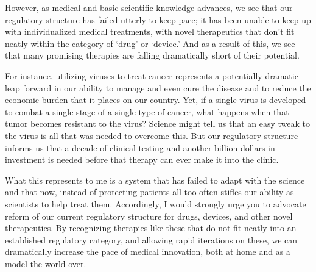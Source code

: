 \documentclass[11pt,letterpaper,final] {article}
\begin{document}
However, as medical and basic scientific knowledge advances, we see that our regulatory structure has failed utterly to keep pace; it has been unable to keep up with individualized medical treatments, with novel therapeutics that don't fit neatly within the category of `drug' or `device.' And as a result of this, we see that many promising therapies are falling dramatically short of their potential.

For instance, utilizing viruses to treat cancer represents a potentially dramatic leap forward in our ability to manage and even cure the disease and to reduce the economic burden that it places on our country. Yet, if a single virus is developed to combat a single stage of a single type of cancer, what happens when that tumor becomes resistant to the virus? Science might tell us that an easy tweak to the virus is all that was needed to overcome this. But our regulatory structure informs us that a decade of clinical testing and another billion dollars in investment is needed before that therapy can ever make it into the clinic.

What this represents to me is a system that has failed to adapt with the science and that now, instead of protecting patients all-too-often stifles our ability as scientists to help treat them. Accordingly, I would strongly urge you to advocate reform of our current regulatory structure for drugs, devices, and other novel therapeutics. By recognizing therapies like these that do not fit neatly into an established regulatory category, and allowing rapid iterations on these, we can dramatically increase the pace of medical innovation, both at home and as a model the world over.


% 
% 
\end{document}
